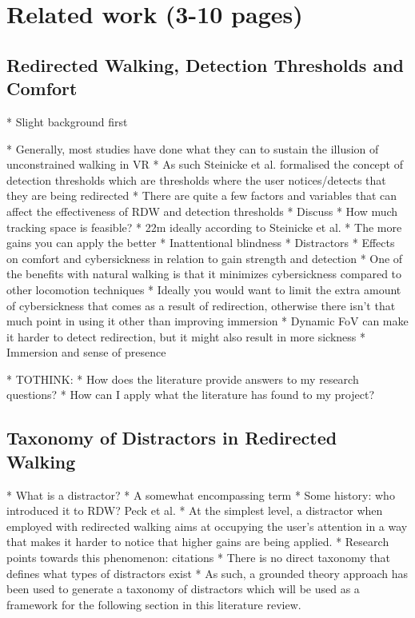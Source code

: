 \chapter{Related work (3-10 pages)}

\section{Redirected Walking, Detection Thresholds and Comfort}
* Slight background first

* Generally, most studies have done what they can to sustain the illusion of unconstrained walking in VR
* As such Steinicke et al. formalised the concept of detection thresholds which are thresholds where the user notices/detects that they are being redirected
* There are quite a few factors and variables that can affect the effectiveness of RDW and detection thresholds
   * Discuss 
* How much tracking space is feasible?
   * 22m ideally according to Steinicke et al.
   * The more gains you can apply the better
   * Inattentional blindness
   * Distractors
* Effects on comfort and cybersickness in relation to gain strength and detection
   * One of the benefits with natural walking is that it minimizes cybersickness compared to other locomotion techniques
   * Ideally you would want to limit the extra amount of cybersickness that comes as a result of redirection, otherwise there isn't that much point in using it other than improving immersion 
   * Dynamic FoV can make it harder to detect redirection, but it might also result in more sickness
* Immersion and sense of presence

* TOTHINK:
    * How does the literature provide answers to my research questions?
    * How can I apply what the literature has found to my project?

\section{Taxonomy of Distractors in Redirected Walking}
* What is a distractor?
   * A somewhat encompassing term
   * Some history: who introduced it to RDW? Peck et al. 
   * At the simplest level, a distractor when employed with redirected walking aims at occupying the user's attention in a way that makes it harder to notice that higher gains are being applied. 
      * Research points towards this phenomenon: citations
   * There is no direct taxonomy that defines what types of distractors exist
   * As such, a grounded theory approach has been used to generate a taxonomy of distractors which will be used as a framework for the following section in this literature review. 
   
